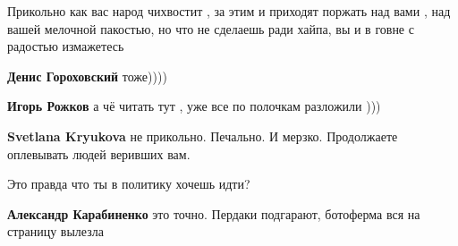 \begin{itemize}
\begin{itemize}
Прикольно как вас народ чихвостит , за этим и приходят поржать над вами , над вашей мелочной пакостью, но что не сделаешь ради хайпа, вы и в говне с радостью измажетесь

 
\textbf{Денис Гороховский} тоже))))

 
\textbf{Игорь Рожков} а чё читать тут , уже все по полочкам разложили )))

 
\textbf{Svetlana Kryukova} не прикольно. Печально. И мерзко. Продолжаете оплевывать людей веривших вам.

 
Это правда что ты в политику хочешь идти?

 
\textbf{Александр Карабиненко} это точно. Пердаки подгарают, ботоферма вся на страницу вылезла \Smiley[1.0][yellow]


\end{itemize}

\end{itemize}

